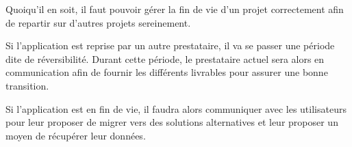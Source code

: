 Quoiqu'il en soit, il faut pouvoir gérer la fin de vie d'un projet correctement afin de repartir sur d'autres projets sereinement. 

Si l'application est reprise par un autre prestataire, il va se passer une période dite de réversibilité. Durant cette période, le prestataire actuel sera alors en communication afin de fournir les différents livrables pour assurer une bonne transition. 

Si l'application est en fin de vie, il faudra alors communiquer avec les utilisateurs pour leur proposer de migrer vers des solutions alternatives et leur proposer un moyen de récupérer leur données.
